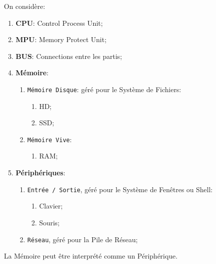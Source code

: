 \documentclass{article}
\begin{document}
\begin{definition}
\begin{figure}[H]
    \end{figure}
    On considère:
    \begin{enumerate}[noitemsep]
        \item \textbf{CPU}: Control Process Unit;
        \item \textbf{MPU}: Memory Protect Unit;
        \item \textbf{BUS}: Connections entre les partis;
        \item \textbf{Mémoire}:
        \begin{enumerate}[noitemsep]
            \item \texttt{Mémoire Disque}: géré pour le Système de Fichiers:
            \begin{enumerate}[noitemsep]
                \item HD;
                \item SSD;
            \end{enumerate}
            \item \texttt{Mémoire Vive}:
            \begin{enumerate}[noitemsep]
                \item RAM;
            \end{enumerate}
        \end{enumerate}
        \item \textbf{Périphériques}:
        \begin{enumerate}[noitemsep]
            \item \texttt{Entrée / Sortie}, géré pour le Système de Fenêtres ou Shell:
            \begin{enumerate}[noitemsep]
                \item Clavier;
                \item Souris; 
            \end{enumerate}
            \item \texttt{Réseau}, géré pour la Pile de Réseau;
        \end{enumerate}
    \end{enumerate}

    \begin{remark}
        La Mémoire peut être interprété comme un Périphérique.
    \end{remark}
\end{definition}
\end{document}
